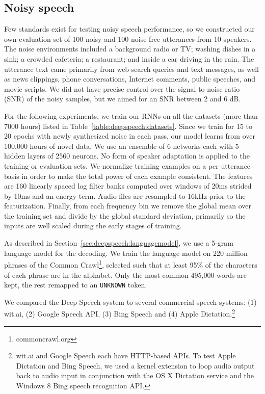 \subsection{Noisy speech}
\label{sec:deepspeech:expnoise}

Few standards exist for testing noisy speech performance, so we constructed our
own evaluation set of 100 noisy and 100 noise-free utterances from 10 speakers.
The noise environments included a background radio or TV; washing dishes in a
sink; a crowded cafeteria; a restaurant; and inside a car driving in the rain.
The utterance text came primarily from web search queries and text messages, as
well as news clippings, phone conversations, Internet comments, public
speeches, and movie scripts. We did not have precise control over the
signal-to-noise ratio (SNR) of the noisy samples, but we aimed for an SNR
between 2 and 6 dB. 

For the following experiments, we train our RNNs on all the datasets (more than
7000 hours) listed in Table~\ref{table:deepspeech:datasets}. Since we train for
15 to 20 epochs with newly synthesized noise in each pass, our model learns
from over 100,000 hours of novel data. We use an ensemble of 6 networks each
with 5 hidden layers of 2560 neurons. No form of speaker adaptation is applied
to the training or evaluation sets. We normalize training examples on a per
utterance basis in order to make the total power of each example consistent.
The features are 160 linearly spaced log filter banks computed over windows of
20ms strided by 10ms and an energy term. Audio files are resampled to 16kHz
prior to the featurization. Finally, from each frequency bin we remove the
global mean over the training set and divide by the global standard deviation,
primarily so the inputs are well scaled during the early stages of training.

As described in Section~\ref{sec:deepspeech:languagemodel}, we use a 5-gram
language model for the decoding. We train the language model on 220 million
phrases of the Common Crawl\footnote{commoncrawl.org}, selected such that at
least 95\% of the characters of each phrase are in the alphabet. Only the most
common 495,000 words are kept, the rest remapped to an \texttt{UNKNOWN} token.

We compared the Deep Speech system to several commercial speech systems: (1)
wit.ai, (2) Google Speech API, (3) Bing Speech and (4) Apple
Dictation.\footnote{wit.ai and Google Speech each have HTTP-based APIs. To test
Apple Dictation and Bing Speech, we used a kernel extension to loop audio
output back to audio input in conjunction with the OS X Dictation service and
the Windows 8 Bing speech recognition API.}

